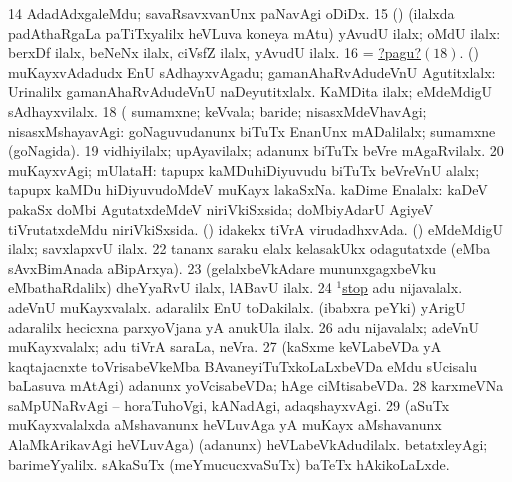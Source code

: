 \eanum
\numie
\num{14}  AdadAdxgaleMdu; savaRsavxvanUnx paNavAgi oDiDx. 
\num{15} (\AmA) (ilalxda padAthaRgaLa paTiTxyalilx heVLuva koneya mAtu) yAvudU ilalx; oMdU ilalx: berxDf ilalx, beNeNx ilalx, ciVsfZ ilalx, yAvudU ilalx. 
\num{16}  = \hyperlink{nothingpagu18}{?pagu?\((18)\)}. 
  
\banum
{} (\AmA) muKayxvAdadudx EnU sAdhayxvAgadu; gamanAhaRvAdudeVnU Agutitxlalx:  Urinalilx gamanAhaRvAdudeVnU naDeyutitxlalx. 
 KaMDita ilalx; eMdeMdigU sAdhayxvilalx. 
\hypertarget{nothingpagu18}{} 
\eanum
\numie
\num{18}  (  sumamxne; keVvala; baride; nisasxMdeVhavAgi; nisasxMshayavAgi:  goNaguvudanunx biTuTx EnanUnx mADalilalx; sumamxne (goNagida). 
\num{19}  vidhiyilalx; upAyavilalx; adanunx biTuTx beVre mAgaRvilalx. 
\num{20}  muKayxvAgi; mUlataH:  tapupx kaMDuhiDiyuvudu biTuTx beVreVnU alalx; tapupx kaMDu hiDiyuvudoMdeV muKayx lakaSxNa. 
  
\banum
{} kaDime Enalalx:  kaDeV pakaSx doMbi AgutatxdeMdeV niriVkiSxsida; doMbiyAdarU AgiyeV tiVrutatxdeMdu niriVkiSxsida. 
 (\viparx) idakekx tiVrA virudadhxvAda. 
 (\viparx) eMdeMdigU ilalx; savxlapxvU ilalx. 
\eanum
\numie
\num{22}  tananx saraku elalx kelasakUkx odagutatxde (eMba sAvxBimAnada aBipArxya). 
\num{23} (gelalxbeVkAdare mununxgagxbeVku eMbathaRdalilx) dheYyaRvU ilalx, lABavU ilalx. 
\num{24} \hyperref{kandict_s.pdf}{S}{stop(1) pagu(4)}{$^1$stop}  
  
\banum
{} adu nijavalalx. 
 adeVnU muKayxvalalx. 
 adaralilx EnU toDakilalx. 
 (ibabxra peYki) yArigU adaralilx hecicxna parxyoVjana yA anukUla ilalx. 
\eanum
\numie
\num{26}  adu nijavalalx; adeVnU muKayxvalalx; adu tiVrA saraLa, neVra. 
\num{27} (kaSxme keVLabeVDa yA kaqtajacnxte toVrisabeVkeMba BAvaneyiTuTxkoLaLxbeVDa eMdu sUcisalu baLasuva mAtAgi) adanunx yoVcisabeVDa; hAge ciMtisabeVDa. 
\num{28}  karxmeVNa saMpUNaRvAgi -- horaTuhoVgi, kANadAgi, adaqshayxvAgi. 
\num{29} (aSuTx muKayxvalalxda aMshavanunx heVLuvAga yA muKayx aMshavanunx AlaMkArikavAgi heVLuvAga) (adanunx) heVLabeVkAdudilalx. 
  
\banum
{} betatxleyAgi; barimeYyalilx. 
 sAkaSuTx (meYmucucxvaSuTx) baTeTx hAkikoLaLxde. 
\eanum
\numie
\enum
\emng
\eentry

